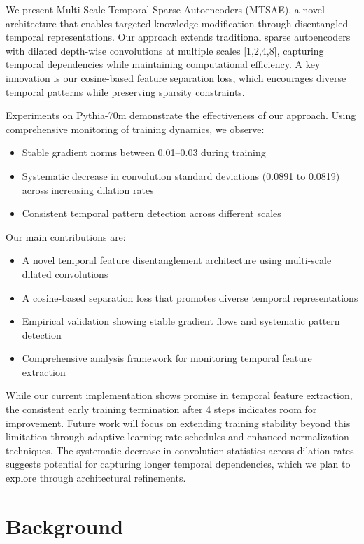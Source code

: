 \documentclass{article} %
\begin{document}
We present Multi-Scale Temporal Sparse Autoencoders (MTSAE), a novel architecture that enables targeted knowledge modification through disentangled temporal representations. Our approach extends traditional sparse autoencoders with dilated depth-wise convolutions at multiple scales [1,2,4,8], capturing temporal dependencies while maintaining computational efficiency. A key innovation is our cosine-based feature separation loss, which encourages diverse temporal patterns while preserving sparsity constraints.

Experiments on Pythia-70m \cite{radford2019language} demonstrate the effectiveness of our approach. Using comprehensive monitoring of training dynamics, we observe:
\begin{itemize}
    \item Stable gradient norms between 0.01--0.03 during training
    \item Systematic decrease in convolution standard deviations (0.0891 to 0.0819) across increasing dilation rates
    \item Consistent temporal pattern detection across different scales
\end{itemize}

Our main contributions are:
\begin{itemize}
    \item A novel temporal feature disentanglement architecture using multi-scale dilated convolutions
    \item A cosine-based separation loss that promotes diverse temporal representations
    \item Empirical validation showing stable gradient flows and systematic pattern detection
    \item Comprehensive analysis framework for monitoring temporal feature extraction
\end{itemize}

While our current implementation shows promise in temporal feature extraction, the consistent early training termination after 4 steps indicates room for improvement. Future work will focus on extending training stability beyond this limitation through adaptive learning rate schedules and enhanced normalization techniques. The systematic decrease in convolution statistics across dilation rates suggests potential for capturing longer temporal dependencies, which we plan to explore through architectural refinements.

\section{Background}
\label{sec:background}
\end{document}
